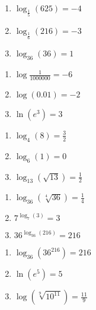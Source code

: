 \begin{multicols}{3}
\begin{enumerate}
\setcounter{enumi}{\value{HW}}


\item $\log_{\frac{1}{5}} (625) = -4$
\item  $\log_{\frac{1}{6}} (216) = -3$
\item $\log_{36} (36)=1$ 

\setcounter{HW}{\value{enumi}}
\end{enumerate}
\end{multicols}

\begin{multicols}{3}
\begin{enumerate}
\setcounter{enumi}{\value{HW}}


\item $\log \frac{1}{1000000} = -6$
\item $\log(0.01) = -2$
\item $\ln\left(e^3\right) = 3$

\setcounter{HW}{\value{enumi}}
\end{enumerate}
\end{multicols}

\begin{multicols}{3}
\begin{enumerate}
\setcounter{enumi}{\value{HW}}


\item $\log_{4} (8) = \frac{3}{2}$
\item $\log_{6} (1) = 0$
\item $\log_{13} \left(\sqrt{13}\right) = \frac{1}{2}$

\setcounter{HW}{\value{enumi}}
\end{enumerate}
\end{multicols}

\begin{multicols}{3}
\begin{enumerate}
\setcounter{enumi}{\value{HW}}


\item $\log_{36} \left(\sqrt[4]{36}\right) = \frac{1}{4}$
\item $7^{\log_{7} (3)} = 3$
\item  $36^{\log_{36}(216)} = 216$

\setcounter{HW}{\value{enumi}}
\end{enumerate}
\end{multicols}

\begin{multicols}{3}
\begin{enumerate}
\setcounter{enumi}{\value{HW}}


\item  $\log_{36} \left(36^{216}\right) = 216$
\item $\ln(e^{5}) = 5$
\item $\log \left(\sqrt[9]{10^{11}}\right) = \frac{11}{9}$

\setcounter{HW}{\value{enumi}}
\end{enumerate}
\end{multicols}

